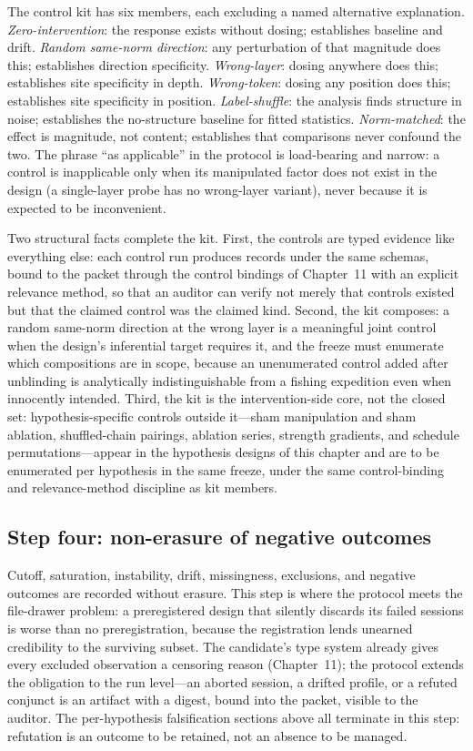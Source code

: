 The control kit has six members, each excluding a named alternative explanation. \emph{Zero-intervention}: the response exists without dosing; establishes baseline and drift. \emph{Random same-norm direction}: any perturbation of that magnitude does this; establishes direction specificity. \emph{Wrong-layer}: dosing anywhere does this; establishes site specificity in depth. \emph{Wrong-token}: dosing any position does this; establishes site specificity in position. \emph{Label-shuffle}: the analysis finds structure in noise; establishes the no-structure baseline for fitted statistics. \emph{Norm-matched}: the effect is magnitude, not content; establishes that comparisons never confound the two. The phrase ``as applicable'' in the protocol is load-bearing and narrow: a control is inapplicable only when its manipulated factor does not exist in the design (a single-layer probe has no wrong-layer variant), never because it is expected to be inconvenient.

Two structural facts complete the kit. First, the controls are typed evidence like everything else: each control run produces records under the same schemas, bound to the packet through the control bindings of Chapter~11 with an explicit relevance method, so that an auditor can verify not merely that controls existed but that the claimed control was the claimed kind. Second, the kit composes: a random same-norm direction at the wrong layer is a meaningful joint control when the design's inferential target requires it, and the freeze must enumerate which compositions are in scope, because an unenumerated control added after unblinding is analytically indistinguishable from a fishing expedition even when innocently intended. Third, the kit is the intervention-side core, not the closed set: hypothesis-specific controls outside it---sham manipulation and sham ablation, shuffled-chain pairings, ablation series, strength gradients, and schedule permutations---appear in the hypothesis designs of this chapter and are to be enumerated per hypothesis in the same freeze, under the same control-binding and relevance-method discipline as kit members.

\subsection{Step four: non-erasure of negative outcomes}\label{hyp:sec:step4}

Cutoff, saturation, instability, drift, missingness, exclusions, and negative outcomes are recorded without erasure. This step is where the protocol meets the file-drawer problem: a preregistered design that silently discards its failed sessions is worse than no preregistration, because the registration lends unearned credibility to the surviving subset. The candidate's type system already gives every excluded observation a censoring reason (Chapter~11); the protocol extends the obligation to the run level---an aborted session, a drifted profile, or a refuted conjunct is an artifact with a digest, bound into the packet, visible to the auditor. The per-hypothesis falsification sections above all terminate in this step: refutation is an outcome to be retained, not an absence to be managed.

